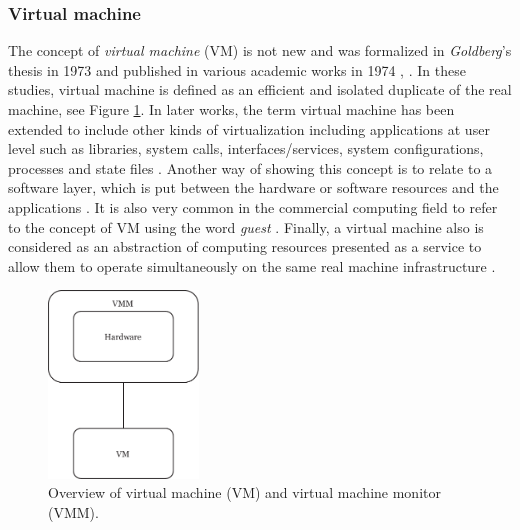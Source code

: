 	\subsubsection{Virtual machine}
	
	The concept of \textit{virtual machine} (VM) is not new and was formalized in \textit{Goldberg}'s thesis in 1973 \cite {Goldberg1973} and published in various academic works in 1974 \cite{Popek1974}, \cite{Goldberg1974}. In these studies, virtual machine is defined as an efficient and isolated duplicate of the real machine, see Figure \ref{fig:TheVirtualMachineMonitor_Popek1974}. In later works, the term virtual machine has been extended to include other kinds of virtualization including applications at user level such as libraries, system calls, interfaces/services, system configurations, processes and state files \cite{Chiueh2005}. Another way of showing this concept is to relate to a software layer, which is put between the hardware or software resources and the applications \cite{Solis2014}. It is also very common in the commercial computing field to refer to the concept of VM using the word \textit{guest} \cite{VMware2008}. Finally, a virtual machine also is considered as an abstraction of computing resources presented as a service to allow them to operate simultaneously on the same real machine infrastructure \cite{Pek2013}.
	
	\begin{figure}[!hbtp]
		\centering
        \includegraphics[width=4cm]{images/TheVirtualMachineMonitor_Popek1974.pdf}
		\vspace{-0.2cm}
		\caption{Overview of virtual machine (VM) and virtual machine monitor (VMM)\footnotemark[2]{}. }
		
		\label{fig:TheVirtualMachineMonitor_Popek1974}
	\end{figure}
	
